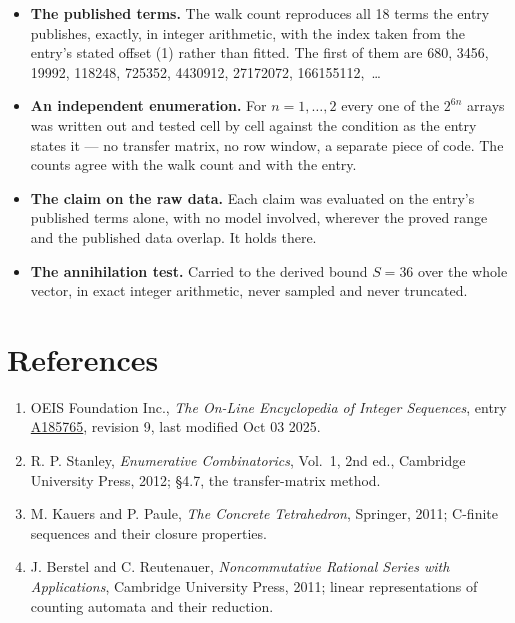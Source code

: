 \documentclass[11pt]{article}
\theoremstyle{definition}
\begin{document}
\begin{itemize}

\item {\bfseries The published terms.} The walk count reproduces all 18 terms the entry publishes, exactly, in integer arithmetic, with the index taken from the entry's stated offset (1) rather than fitted. The first of them are 680, 3456, 19992, 118248, 725352, 4430912, 27172072, 166155112,~\dots

\item {\bfseries An independent enumeration.} For $n = 1,\dots,2$ every one of the $2^{6n}$ arrays was written out and tested cell by cell against the condition as the entry states it --- no transfer matrix, no row window, a separate piece of code. The counts agree with the walk count and with the entry.

\item {\bfseries The claim on the raw data.} Each claim was evaluated on the entry's published terms alone, with no model involved, wherever the proved range and the published data overlap. It holds there.

\item {\bfseries The annihilation test.} Carried to the derived bound $S = 36$ over the whole vector, in exact integer arithmetic, never sampled and never truncated.

\end{itemize}

\section{References}

\begin{enumerate}

\item OEIS Foundation Inc., \emph{The On-Line Encyclopedia of Integer Sequences}, entry \href{https://oeis.org/A185765}{A185765}, revision 9, last modified Oct 03 2025.

\item R. P. Stanley, \emph{Enumerative Combinatorics}, Vol.~1, 2nd ed., Cambridge University Press, 2012; \S4.7, the transfer-matrix method.

\item M. Kauers and P. Paule, \emph{The Concrete Tetrahedron}, Springer, 2011; C-finite sequences and their closure properties.

\item J. Berstel and C. Reutenauer, \emph{Noncommutative Rational Series with Applications}, Cambridge University Press, 2011; linear representations of counting automata and their reduction.

\end{enumerate}
\end{document}
